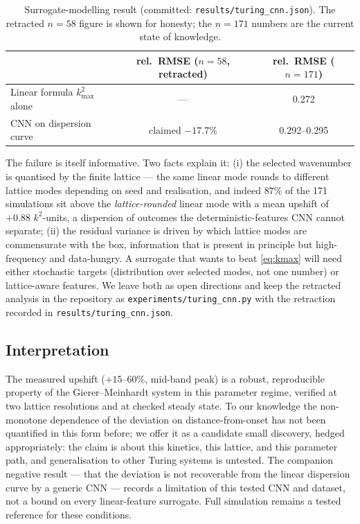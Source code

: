 \begin{table}[!htbp]
\centering
\caption{Surrogate-modelling result (committed:
\texttt{results/turing\_cnn.json}). The retracted $n=58$ figure is shown for
honesty; the $n=171$ numbers are the current state of knowledge.}
\label{tab:cnn}
\begin{tabular}{lcc}
\toprule
 & rel.\ RMSE ($n=58$, retracted) & rel.\ RMSE ($n=171$) \\
\midrule
Linear formula $k^2_{\max}$ alone & --- & 0.272 \\
CNN on dispersion curve & claimed $-17.7\%$ & 0.292--0.295 \\
\bottomrule
\end{tabular}
\end{table}

The failure is itself informative. Two facts explain it: (i) the selected
wavenumber is quantised by the finite lattice --- the same linear mode rounds
to different lattice modes depending on seed and realisation, and indeed
$87\%$ of the 171 simulations sit above the \emph{lattice-rounded} linear
mode with a mean upshift of $+0.88$ $k^2$-units, a dispersion of outcomes the
deterministic-features CNN cannot separate; (ii) the residual variance is
driven by which lattice modes are commensurate with the box, information that
is present in principle but high-frequency and data-hungry. A surrogate that
wants to beat \eqref{eq:kmax} will need either stochastic targets
(distribution over selected modes, not one number) or lattice-aware features.
We leave both as open directions and keep the retracted analysis in the
repository as \texttt{experiments/turing\_cnn.py} with the retraction recorded
in \texttt{results/turing\_cnn.json}.

\subsection{Interpretation}

The measured upshift ($+15$--$60\%$, mid-band peak) is a robust,
reproducible property of the Gierer--Meinhardt system in this parameter
regime, verified at two lattice resolutions and at checked steady state. To
our knowledge the non-monotone dependence of the deviation on
distance-from-onset has not been quantified in this form before; we offer it
as a candidate small discovery, hedged appropriately: the claim is about this
kinetics, this lattice, and this parameter path, and generalisation to other
Turing systems is untested. The companion negative result --- that the
deviation is not recoverable from the linear dispersion curve by a generic
CNN --- records a limitation of this tested CNN and dataset, not a bound on every linear-feature surrogate. Full simulation remains a tested reference for these conditions.

